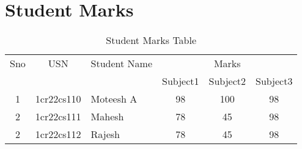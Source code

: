 \documentclass{article}
\begin{document}
\section*{Student Marks}
\begin{table}[htbp]
		\centering
		\caption{Student Marks Table}
		\label{tab:student-marks}
\begin{tabularx}{\textwidth}{|c|c|X|c|c|c}
		\hline
		Sno & USN & Student Name & \multicolumn{3}{c|}{Marks} \\
		\cline{4-6}
&&& Subject1 & Subject2 & Subject3 \\
		\hline
		1 & 1cr22cs110 & Moteesh A  & 98 & 100 & 98 \\
		\hline
		2 & 1cr22cs111 & Mahesh  & 78 & 45 & 98 \\
		\hline
		2 & 1cr22cs112 & Rajesh  & 78 & 45 & 98 \\
		\hline
	\end{tabularx}
\end{table}
\end{document}
